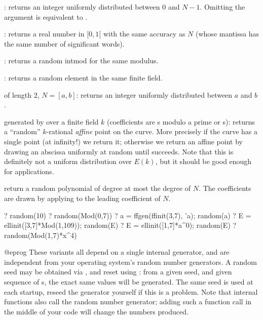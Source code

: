 \item {}: returns an integer
uniformly distributed between $0$ and $N-1$. Omitting the argument
is equivalent to .

\item {}: returns a real number in $[0,1[$ with the same accuracy as
$N$ (whose mantissa has the same number of significant words).

\item {}: returns a random intmod for the same modulus.

\item {}: returns a random element in the same finite field.

\item {} of length $2$, $N = [a,b]$: returns an integer uniformly
distributed between $a$ and $b$.

\item {} generated by  over a finite field $k$
(coefficients are s modulo a prime or s): returns a
``random'' $k$-rational \emph{affine} point on the curve. More precisely
if the curve has a single point (at infinity!) we return it; otherwise
we return an affine point by drawing an abscissa uniformly at
random until  succeeds. Note that this is definitely not a
uniform distribution over $E(k)$, but it should be good enough for
applications.

\item {} return a random polynomial of degree at most the degree of $N$.
The coefficients are drawn by applying  to the leading
coefficient of $N$.

\bprog
? random(10)
? random(Mod(0,7))
? a = ffgen(ffinit(3,7), 'a); random(a)
? E = ellinit([3,7]*Mod(1,109)); random(E)
? E = ellinit([1,7]*a^0); random(E)
? random(Mod(1,7)*x^4)

@eprog
These variants all depend on a single internal generator, and are
independent from your operating system's random number generators.
A random seed may be obtained via , and reset
using : from a given seed, and given sequence of s,
the exact same values will be generated. The same seed is used at each
startup, reseed the generator yourself if this is a problem. Note that
internal functions also call the random number generator; adding such a
function call in the middle of your code will change the numbers produced.

